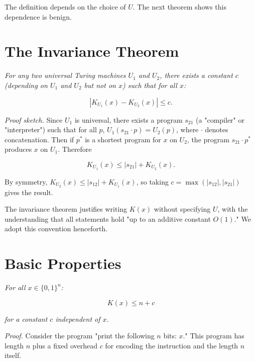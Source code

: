 \begin{remark}
The definition depends on the choice of $U$. The next theorem shows this dependence is benign.
\end{remark}



\section{The Invariance Theorem}

\begin{theorem}
\textit{For any two universal Turing machines $U_1$ and $U_2$, there exists a constant $c$ (depending on $U_1$ and $U_2$ but not on $x$) such that for all $x$:}

\[|K_{U_1}(x) - K_{U_2}(x)| \leq c.\]

\textit{Proof sketch.} Since $U_1$ is universal, there exists a program $s_{21}$ (a "compiler" or "interpreter") such that for all $p$, $U_1(s_{21} \cdot p) = U_2(p)$, where $\cdot$ denotes concatenation. Then if $p^*$ is a shortest program for $x$ on $U_2$, the program $s_{21} \cdot p^*$ produces $x$ on $U_1$. Therefore

\[K_{U_1}(x) \leq |s_{21}| + K_{U_2}(x).\]

By symmetry, $K_{U_2}(x) \leq |s_{12}| + K_{U_1}(x)$, so taking $c = \max(|s_{12}|, |s_{21}|)$ gives the result. 

The invariance theorem justifies writing $K(x)$ without specifying $U$, with the understanding that all statements hold "up to an additive constant $O(1)$." We adopt this convention henceforth.



\end{theorem}


\section{Basic Properties}

\begin{proposition}
\textit{For all $x \in \{ 0,1\} ^n$:}

\[K(x) \leq n + c\]

\textit{for a constant $c$ independent of $x$.}


\end{proposition}

\textit{Proof.} Consider the program "print the following $n$ bits: $x$." This program has length $n$ plus a fixed overhead $c$ for encoding the instruction and the length $n$ itself.

